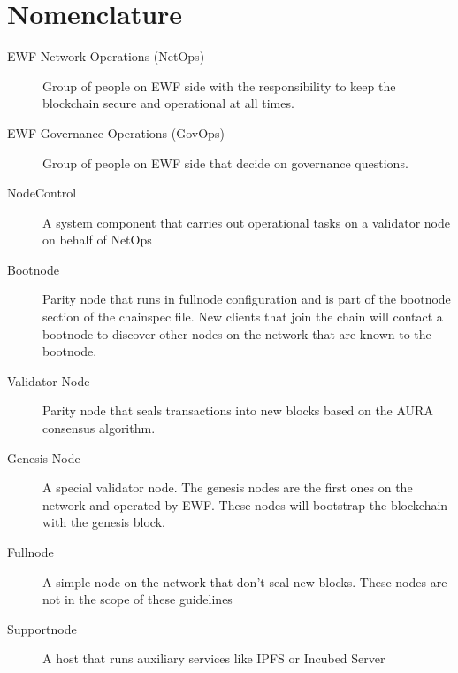 \section{Nomenclature}

\begin{description}
    \item[EWF Network Operations (NetOps)] 
        Group of people on EWF side with the responsibility to keep the blockchain secure and operational at all times.
    \item[EWF Governance Operations (GovOps)] 
        Group of people on EWF side that decide on governance questions.
    \item[NodeControl] 
        A system component that carries out operational tasks on a validator node on behalf of NetOps
    \item[Bootnode] 
        Parity node that runs in fullnode configuration and is part of the bootnode section of the chainspec file.
        New clients that join the chain will contact a bootnode to discover other nodes on the network that are known to the bootnode.
    \item[Validator Node]
        Parity node that seals transactions into new blocks based on the AURA consensus algorithm.
    \item[Genesis Node]
        A special validator node. The genesis nodes are the first ones on the network and operated by EWF. These nodes will bootstrap the blockchain with the genesis block.
    \item[Fullnode]
        A simple node on the network that don't seal new blocks. These nodes are not in the scope of these guidelines
    \item[Supportnode]
        A host that runs auxiliary services like IPFS or Incubed Server

\end{description}
